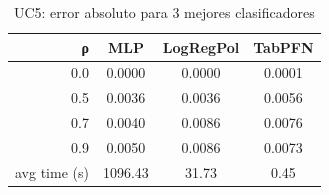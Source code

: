 \begin{table}[ht]
\centering
\caption{UC5: error absoluto para 3 mejores clasificadores}
\label{tab:uc5_compact_top3}
\begin{tabular}{rccc}
\toprule
ρ & MLP & LogRegPol & TabPFN \\
\midrule
0.0 & 0.0000 & 0.0000 & 0.0001 \\
0.5 & 0.0036 & 0.0036 & 0.0056 \\
0.7 & 0.0040 & 0.0086 & 0.0076 \\
0.9 & 0.0050 & 0.0086 & 0.0073 \\
avg time (s) & 1096.43 & 31.73 & 0.45 \\
\bottomrule
\end{tabular}

\end{table}